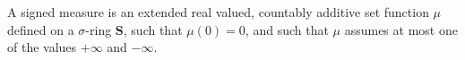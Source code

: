 A signed measure is an extended real valued, countably additive set function $\mu$ defined on a $\sigma$-ring $\mathbf{S}$, such that $\mu(0) = 0$, and such that $\mu$ assumes at most one of the values $+\infty$ and $-\infty$.
